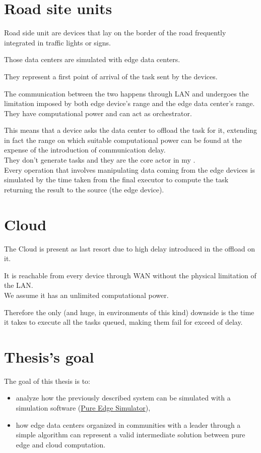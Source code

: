 \documentclass[12pt]{report}
\begin{document}
\section{Road site units}
Road side unit are devices that lay on the border of the road frequently integrated in traffic lights or signs.

Those data centers are simulated with edge data centers.

They represent a first point of arrival of the task sent by the devices.

The communication between the two happens through LAN and undergoes the limitation imposed by both edge device's range and the edge data center's range.\\
They have computational power and can act as orchestrator.

This means that a device asks the data center to offload the task for it, extending in fact the range on which suitable computational power can be found at the expense of the introduction of communication delay.\\
They don't generate tasks and they are the core actor in my .\\

Every operation that involves manipulating data coming from the edge devices is simulated by the time taken from the final executor to compute the task returning the result to the source (the edge device).

\section{Cloud}
The Cloud is present as last resort due to high delay introduced in the offload on it.

It is reachable from every device through WAN without the physical limitation of the LAN.\\

We assume it has an unlimited computational power.

Therefore the only  (and huge, in environments of this kind) downside is the time it takes to execute all the tasks queued, making them fail for exceed of  delay.

\section{Thesis's goal}
The goal of this thesis is to:
\begin{itemize}
	\item analyze how the previously described system can be simulated with a simulation software (\hyperref[PES]{Pure Edge Simulator}),
	\item how edge data centers organized in communities with a leader through a simple algorithm can represent a valid intermediate solution between pure edge and cloud computation.
\end{itemize}
\end{document}
